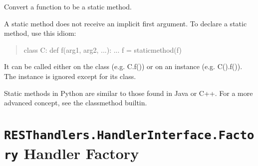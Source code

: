 \documentclass[letterpaper,10pt,english]{sphinxmanual}
\begin{document}
\begin{fulllineitems}
\begin{fulllineitems}
Convert a function to be a static method.

A static method does not receive an implicit first argument.
To declare a static method, use this idiom:
\begin{quote}

class C:
def f(arg1, arg2, ...): ...
f = staticmethod(f)
\end{quote}

It can be called either on the class (e.g. C.f()) or on an instance
(e.g. C().f()).  The instance is ignored except for its class.

Static methods in Python are similar to those found in Java or C++.
For a more advanced concept, see the classmethod builtin.

\end{fulllineitems}


\begin{fulllineitems}
\label{handler/interface:RESThandlers.HandlerInterface.HandlerBaseClass.HandlerBase.insert_to_db}
\end{fulllineitems}


\begin{fulllineitems}
\label{handler/interface:RESThandlers.HandlerInterface.HandlerBaseClass.HandlerBase.search}
\end{fulllineitems}


\begin{fulllineitems}
\label{handler/interface:RESThandlers.HandlerInterface.HandlerBaseClass.HandlerBase.update_db}
\end{fulllineitems}


\end{fulllineitems}



\section{\texttt{RESThandlers.HandlerInterface.Factory} Handler Factory}
\label{handler/factory::doc}\label{handler/factory:resthandlers-handlerinterface-factory-handler-factory}\label{handler/factory:module-RESThandlers.HandlerInterface.Factory}\label{handler/factory:module-Handlers.Interface.Factory}
\end{document}
